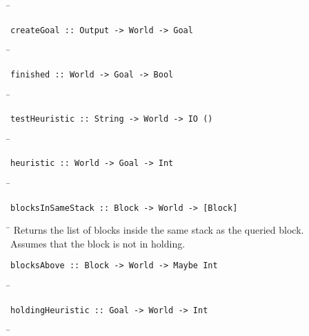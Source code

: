 \begin{tabbing}
\hspace*{1cm}\= \kill
\> 
\end{tabbing}
\begin{verbatim}
createGoal :: Output -> World -> Goal
\end{verbatim}
\begin{tabbing}
\hspace*{1cm}\= \kill
\> 
\end{tabbing}
\begin{verbatim}
finished :: World -> Goal -> Bool
\end{verbatim}
\begin{tabbing}
\hspace*{1cm}\= \kill
\> 
\end{tabbing}
\begin{verbatim}
testHeuristic :: String -> World -> IO ()
\end{verbatim}
\begin{tabbing}
\hspace*{1cm}\= \kill
\> 
\end{tabbing}
\begin{verbatim}
heuristic :: World -> Goal -> Int
\end{verbatim}
\begin{tabbing}
\hspace*{1cm}\= \kill
\> 
\end{tabbing}
\begin{verbatim}
blocksInSameStack :: Block -> World -> [Block]
\end{verbatim}
\begin{tabbing}
\hspace*{1cm}\= \kill
\> Returns the list of blocks inside the same stack as the queried block.\\
\> Assumes that the block is not in holding.
\end{tabbing}
\begin{verbatim}
blocksAbove :: Block -> World -> Maybe Int
\end{verbatim}
\begin{tabbing}
\hspace*{1cm}\= \kill
\> 
\end{tabbing}
\begin{verbatim}
holdingHeuristic :: Goal -> World -> Int
\end{verbatim}
\begin{tabbing}
\hspace*{1cm}\= \kill
\> 
\end{tabbing}
